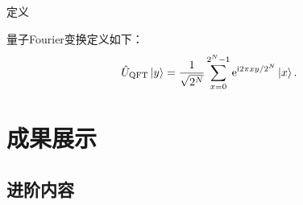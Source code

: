 \documentclass{beamer}
\begin{document}
\begin{frame}{定义}
    \begin{definition}
        量子Fourier变换定义如下：
        \[
            \hat{U}_{\mathrm{QFT}}\ket{y}=\frac{1}{\sqrt{2^N}}\sum_{x=0}^{2^N-1}\mathrm{e}^{\mathrm{i}2\pi xy/2^N}\ket{x}.
        \]
    \end{definition}
\end{frame}

\section{成果展示}

\subsection{进阶内容}
\end{document}
